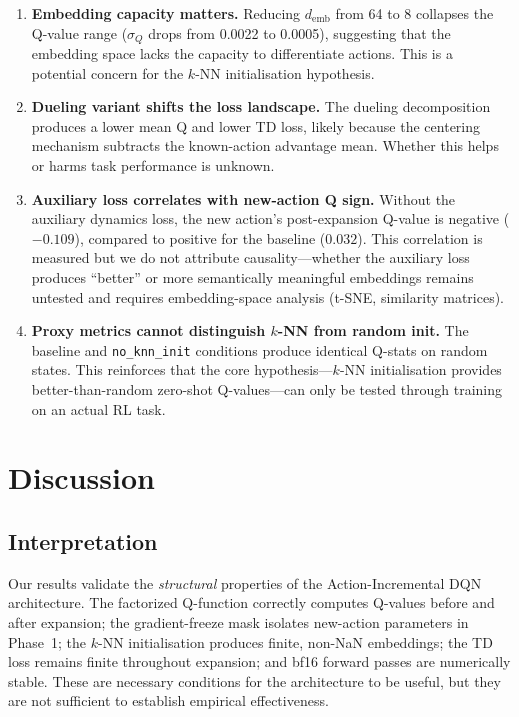 \documentclass{article}
\begin{document}
\begin{enumerate}
  \item \textbf{Embedding capacity matters.} Reducing $d_\text{emb}$ from 64
  to 8 collapses the Q-value range ($\sigma_Q$ drops from 0.0022 to 0.0005),
  suggesting that the embedding space lacks the capacity to differentiate
  actions. This is a potential concern for the $k$-NN initialisation
  hypothesis.
  \item \textbf{Dueling variant shifts the loss landscape.} The dueling
  decomposition produces a lower mean Q and lower TD loss, likely because the
  centering mechanism subtracts the known-action advantage mean. Whether this
  helps or harms task performance is unknown.
  \item \textbf{Auxiliary loss correlates with new-action Q sign.} Without the
  auxiliary dynamics loss, the new action's post-expansion Q-value is negative
  ($-0.109$), compared to positive for the baseline ($0.032$). This
  correlation is measured but we do not attribute causality---whether the
  auxiliary loss produces ``better'' or more semantically meaningful embeddings
  remains untested and requires embedding-space analysis (t-SNE, similarity
  matrices).
  \item \textbf{Proxy metrics cannot distinguish $k$-NN from random init.}
  The baseline and \texttt{no\_knn\_init} conditions produce identical Q-stats
  on random states. This reinforces that the core hypothesis---$k$-NN
  initialisation provides better-than-random zero-shot Q-values---can only be
  tested through training on an actual RL task.
\end{enumerate}


\section{Discussion}
\label{sec:discussion}

\subsection{Interpretation}

Our results validate the \emph{structural} properties of the Action-Incremental
DQN architecture. The factorized Q-function correctly computes Q-values before
and after expansion; the gradient-freeze mask isolates new-action parameters in
Phase~1; the $k$-NN initialisation produces finite, non-NaN embeddings; the TD
loss remains finite throughout expansion; and bf16 forward passes are
numerically stable. These are necessary conditions for the architecture to be
useful, but they are not sufficient to establish empirical effectiveness.
\end{document}

